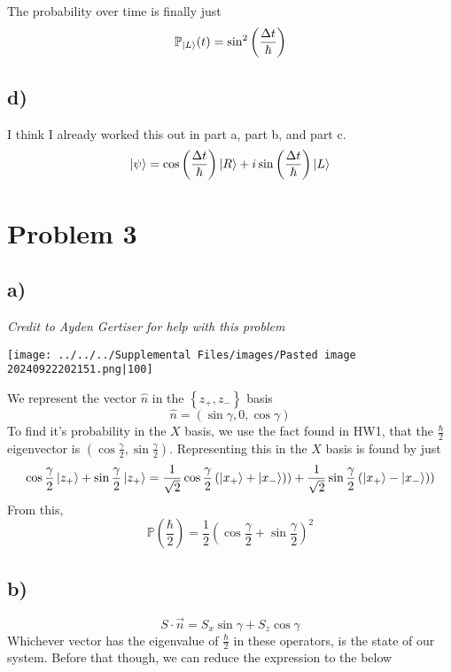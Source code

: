 \documentclass[]{article}
\begin{document}
The probability over time is finally just \[
\mathbb{P}_{\ket{L} }(t) = \sin^{2} \left( \frac{\Delta t}{\hbar} \right) 
\]

\hypertarget{d}{%
\subsection{d)}\label{d}}

I think I already worked this out in part a, part b, and part c. \[
\ket{\psi}  = \cos \left( \frac{\Delta t}{\hbar} \right)\ket{R}  +i\sin \left( \frac{\Delta t}{\hbar} \right) \ket{L} 
\]

\hypertarget{problem-3}{%
\section{Problem 3}\label{problem-3}}

\hypertarget{a-1}{%
\subsection{a)}\label{a-1}}

\emph{Credit to Ayden Gertiser for help with this problem}

\texttt{[image: ../../../Supplemental Files/images/Pasted image 20240922202151.png|100]}

We represent the vector \(\hat{n}\) in the
\(\left\{ z_{+},z_{-} \right\}\) basis \[
\hat{n} = \left( \sin \gamma,0,\cos \gamma \right) 
\] To find it's probability in the \(X\) basis, we use the fact found in
HW1, that the \(\frac{\hbar}{2}\) eigenvector is
\(\left( \cos \frac{\gamma}{2},\sin \frac{\gamma}{2} \right)\).
Representing this in the \(X\) basis is found by just \[
\begin{align}
\cos \frac{\gamma}{2}\ket{z_{+}} +\sin \frac{\gamma}{2}\ket{z_{+}} = \frac{1}{\sqrt{ 2 }} \cos \frac{\gamma}{2}\left(\ket{x_{+}  }+\ket{x_{-}} )\right)  + \frac{1}{\sqrt{ 2 }} \sin \frac{\gamma}{2} \left(  \ket{x_{+}  }-\ket{x_{-}} )\right) 
\end{align}
\] From this, \[
\mathbb{P}\left( \frac{\hbar}{2} \right) = \frac{1}{2}\left(  \cos \frac{\gamma}{2}+ \sin \frac{\gamma}{2} \right) ^{2}
\]

\hypertarget{b-1}{%
\subsection{b)}\label{b-1}}

\[
S\cdot\vec{n} = S_{x}\sin\gamma+S_{z}\cos\gamma
\] Whichever vector has the eigenvalue of \(\frac{\hbar}{2}\) in these
operators, is the state of our system. Before that though, we can reduce
the expression to the below
\end{document}
